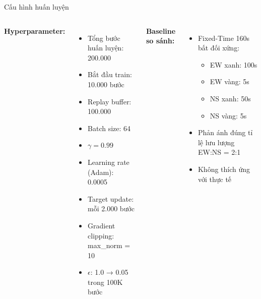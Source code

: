 \begin{frame}{Cấu hình huấn luyện}
\begin{columns}
\textbf{Hyperparameter:}
\begin{itemize}
    \item Tổng bước huấn luyện: 200.000
    \item Bắt đầu train: 10.000 bước
    \item Replay buffer: 100.000
    \item Batch size: 64
    \item $\gamma = 0.99$
    \item Learning rate (Adam): 0.0005
    \item Target update: mỗi 2.000 bước
    \item Gradient clipping: max\_norm = 10
    \item $\epsilon$: 1.0 → 0.05 trong 100K bước
\end{itemize}

\textbf{Baseline so sánh:}
\begin{itemize}
    \item Fixed-Time 160s bất đối xứng:
    \begin{itemize}
        \item EW xanh: 100s
        \item EW vàng: 5s
        \item NS xanh: 50s
        \item NS vàng: 5s
    \end{itemize}
    \item Phản ánh đúng tỉ lệ lưu lượng EW:NS = 2:1
    \item Không thích ứng với thực tế
\end{itemize}
\end{columns}
\end{frame}
